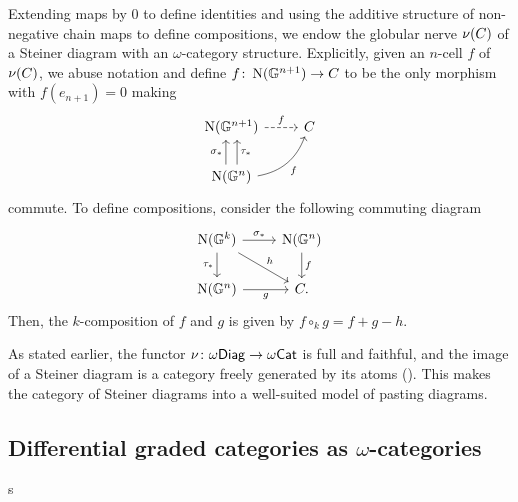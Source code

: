 \SS Extending maps by $0$ to define identities and using the additive structure of non-negative chain maps to define compositions, we endow the globular nerve $\nu(C)$ of a Steiner diagram with an $\omega$-category structure.
Explicitly, given an $n$-cell $f$ of $\nu(C)$, we abuse notation and define $f \colon \operatorname{N}(\mathbb{G}^{n+1}) \to C$ to be the only morphism with $f(e_{n+1}) = 0$ making
\[
\begin{tikzcd}
	\chains(\bG^{n+1}) \arrow[dashed, r, "f"] & C \\
	\chains(\bG^n) \arrow[u, shift left=4pt, "\sigma_*"] \arrow[u, shift right=4pt, "\tau_*"'] \arrow[ur, bend right, "f"'] &
\end{tikzcd} 
\]
commute.
To define compositions, consider the following commuting diagram
\[
\begin{tikzcd}
	\chains(\bG^{k}) \rar["\sigma_*"] \dar["\tau_*"'] \arrow[dr, "h"]& \chains(\bG^{n}) \dar["f"] \\
	\chains(\bG^n) \arrow[r, "g"'] & C.
\end{tikzcd} 
\]
Then, the $k$-composition of $f$ and $g$ is given by $f \circ_k g = f + g - h$. 

\medskip

As stated earlier, the functor $\nu \colon \omega\mathsf{Diag} \to \omega\mathsf{Cat}$ is full and faithful, and the image of a Steiner diagram is a category freely generated by its atoms (\cite[Thm~5.11]{steiner2004omega}).
This makes the category of Steiner diagrams into a well-suited model of pasting diagrams.

\subsection{Differential graded categories as $\omega$-categories}

s
